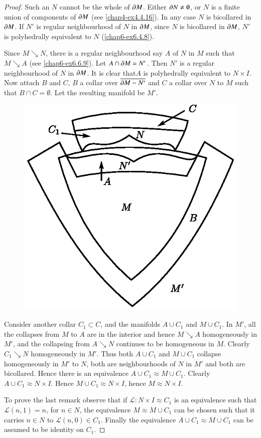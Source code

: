 \begin{proof}
Such an $N$ cannot be the whole of $\partial M$. Either $\partial N\neq \emptyset$, or $N$ is a finite union of components of $\partial M$ (see \ref{chap4-ex4.4.16}). In any case $N$ is bicollared in $\partial M$. If $N'$ is regular neighbourhood of $N$ in $\partial M$, since $N$ is bicollared in $\partial M$, $N'$ is polyhedrally equivalent to $N$ (\ref{chap6-ex6.4.8}).

Since $M\searrow N$, there is a regular neighbourhood say $A$ of $N$ in $M$ such that $M\searrow A$ (see \ref{chap6-ex6.6.9}). Let $A\cap \partial M=N'$. Then $N'$ is a regular neighbourhood of $N$ in $\partial M$. It is clear that\pageoriginale $A$ is polyhedrally equivalent to $N\times I$. Now attach $B$ and $C$, $B$ a collar over $\overline{\partial M-N'}$ and $C$ a collar over $N$ to $M$ such that $B\cap C=\emptyset$. Let the resulting manifold be $M'$.
\begin{figure}[H]
\centering
\includegraphics{figure/fig18.eps}
\end{figure}

Consider another collar $C_{1}\subset C$, and the manifolds $A\cup C_{1}$ and $M\cup C_{1}$. In $M'$, all the collapses from $M$ to $A$ are in the interior and hence $M\searrow A$ homogeneously in $M'$, and the collapsing from $A\searrow N$ continues to be homogeneous in $M$. Clearly $C_{1}\searrow N$ homogeneously in $M'$. Thus both $A\cup C_{1}$ and $M\cup C_{1}$ collapse homogeneously in $M'$ to $N$, both are neighbourhoods of $N$ in $M'$ and both are bicollared. Hence there is an equivalence $A\cup C_{1}\approx M\cup C_{1}$. Clearly $A\cup C_{1}\approx N\times I$. Hence $M\cup C_{1}\approx N\times I$, hence $M\approx N\times I$.

To prove the last remark observe that if $\mathscr{L}:N\times I\approx C_{1}$ is an equivalence such that $\mathscr{L}(n,1)=n$, for $n\in N$, the equivalence $M\approx M\cup C_{1}$ can be chosen such that it carries $n\in N$ to $\mathscr{L}(n,0)\in C_{1}$. Finally the equivalence $A\cup C_{1}\approx M\cup C_{1}$ can be assumed to be identity on $C_{1}$.
\end{proof}

